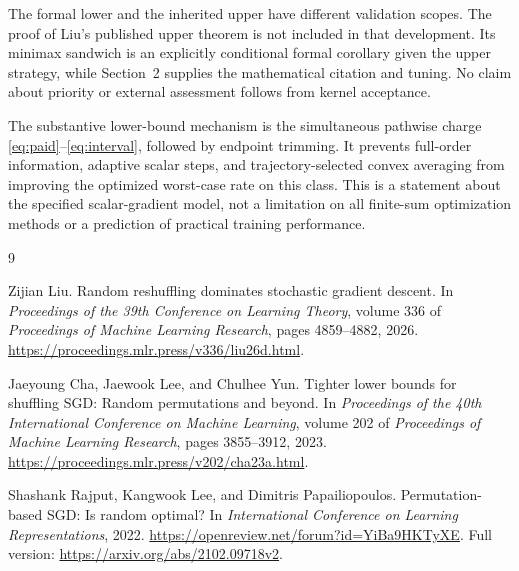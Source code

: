 \documentclass[11pt]{article}
\theoremstyle{remark}
\begin{document}
The formal lower and the inherited upper have different validation
scopes. The proof of Liu's published upper theorem is not included in
that development. Its minimax sandwich is an explicitly conditional
formal corollary given the upper strategy, while Section~2 supplies
the mathematical citation and tuning. No claim about priority or
external assessment follows from kernel acceptance.

The substantive lower-bound mechanism is the simultaneous pathwise
charge \eqref{eq:paid}--\eqref{eq:interval}, followed by endpoint
trimming. It prevents full-order information, adaptive scalar steps,
and trajectory-selected convex averaging from improving the optimized
worst-case rate on this class. This is a statement about the specified
scalar-gradient model, not a limitation on all finite-sum optimization
methods or a prediction of practical training performance.

\begin{thebibliography}{9}
\small
\setlength{\itemsep}{4pt}

Zijian Liu.
\newblock Random reshuffling dominates stochastic gradient descent.
\newblock In \emph{Proceedings of the 39th Conference on Learning Theory},
volume 336 of \emph{Proceedings of Machine Learning Research},
pages 4859--4882, 2026.
\newblock \url{https://proceedings.mlr.press/v336/liu26d.html}.

Jaeyoung Cha, Jaewook Lee, and Chulhee Yun.
\newblock Tighter lower bounds for shuffling SGD: Random permutations
and beyond.
\newblock In \emph{Proceedings of the 40th International Conference on
Machine Learning}, volume 202 of \emph{Proceedings of Machine Learning
Research}, pages 3855--3912, 2023.
\newblock \url{https://proceedings.mlr.press/v202/cha23a.html}.

Shashank Rajput, Kangwook Lee, and Dimitris Papailiopoulos.
\newblock Permutation-based SGD: Is random optimal?
\newblock In \emph{International Conference on Learning Representations},
2022.
\newblock \url{https://openreview.net/forum?id=YiBa9HKTyXE}.
\newblock Full version: \url{https://arxiv.org/abs/2102.09718v2}.

\end{thebibliography}
\end{document}
